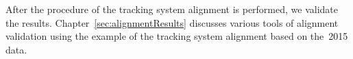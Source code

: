 After the procedure of the tracking system alignment is performed, we validate the results. Chapter~\ref{sec:alignmentResults} discusses various tools of alignment validation using the example of the tracking system alignment based on the~2015 data.   


